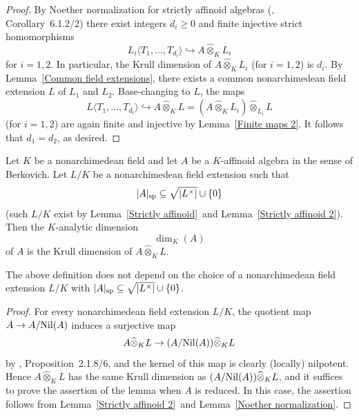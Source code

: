 \begin{proof}By Noether normalization for strictly affinoid algebras (\cite{BGR}, Corollary~6.1.2/2) there exist integers $d_{i}\geq0$ and finite injective strict homomorphisms \begin{equation*}L_{i}\langle T_1,\dots, T_{d_{i}}\rangle \hookrightarrow A\widehat{\otimes}_{K}L_{i}\end{equation*}for $i=1, 2$. In particular, the Krull dimension of $A\widehat{\otimes}_{K}L_{i}$ (for $i=1, 2$) is $d_{i}$. By Lemma~\ref{Common field extensions}, there exists a common nonarchimedean field extension $L$ of $L_{1}$ and $L_{2}$. Base-changing to $L$, the maps \begin{equation*}L\langle T_1,\dots, T_{d_{i}}\rangle\hookrightarrow A\widehat{\otimes}_{K}L=(A\widehat{\otimes}_{K}L_{i})\widehat{\otimes}_{L_{i}}L\end{equation*}(for $i=1, 2$) are again finite and injective by Lemma~\ref{Finite maps 2}. It follows that $d_{1}=d_{2}$, as desired.\end{proof}
\begin{defn}
    Let $K$ be a nonarchimedean field and let \(A\) be a $K$-affinoid algebra in the sense of Berkovich. 
    Let $L/K$ be a nonarchimedean field extension such that \begin{equation*}\vert A\vert_{\mathrm{sp}}\subseteq \sqrt{\vert L^{\times}\vert}\cup\{0\}\end{equation*}(such $L/K$ exist by Lemma~\ref{Strictly affinoid} and Lemma~\ref{Strictly affinoid 2}). Then the $K$-analytic dimension \begin{equation*}\dim_{K}(A)\end{equation*}of $A$ is the Krull dimension of $A\widehat{\otimes}_{K}L$. \end{defn}
\begin{lemma}\label{Lemma on analytic dimension}The above definition does not depend on the choice of a nonarchimedean field extension $L/K$ with $\vert A\vert_{\mathrm{sp}}\subseteq \sqrt{\vert L^{\times}\vert}\cup\{0\}$.\end{lemma}
\begin{proof}For every nonarchimedean field extension $L/K$, the quotient map $A\to A/\mathrm{Nil}(A)$ induces a surjective map \begin{equation*}A\widehat{\otimes}_{K}L\to (A/\mathrm{Nil}(A))\widehat{\otimes}_{K}L\end{equation*}by \cite{BGR}, Proposition~2.1.8/6, and the kernel of this map is clearly (locally) nilpotent. Hence $A\widehat{\otimes}_{K}L$ has the same Krull dimension as $(A/\mathrm{Nil}(A))\widehat{\otimes}_{K}L$, and it suffices to prove the assertion of the lemma when $A$ is reduced. In this case, the assertion follows from Lemma~\ref{Strictly affinoid 2} and Lemma~\ref{Noether normalization}. \end{proof}
